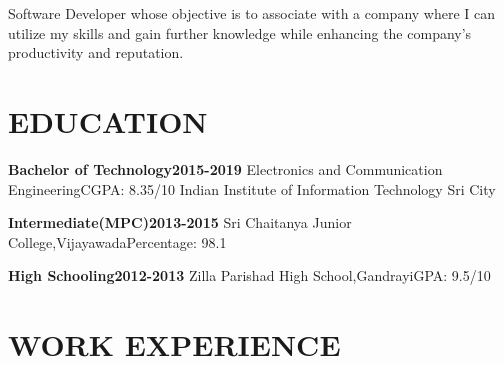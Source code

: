 \documentclass[12pt,a4paper,sans]{moderncv}        %
\begin{document}
\makecvtitle
\small{Software Developer whose objective is to associate with a company where I can utilize my skills and gain further knowledge while enhancing the company’s productivity and reputation.}

\section{EDUCATION}





{\textbf{Bachelor of Technology}}\hfill{\textbf{2015-2019}}\newline
{Electronics and Communication Engineering}\hfill{CGPA: 8.35/10} \newline
{Indian Institute of Information Technology Sri City} 
\newline

{\textbf{Intermediate(MPC)}}\hfill{\textbf{2013-2015}}\newline
{Sri Chaitanya Junior College,Vijayawada}\hfill{Percentage: 98.1} \newline

{\textbf{High Schooling}}\hfill{\textbf{2012-2013}}\newline
{Zilla Parishad High School,Gandrayi}\hfill{GPA: 9.5/10} %


\section{WORK EXPERIENCE}
\end{document}
